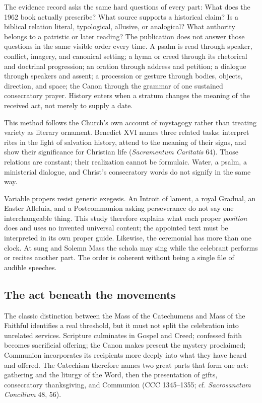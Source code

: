 {The evidence record asks the same hard questions of every part: What does the 1962 book actually prescribe? What source supports a historical claim? Is a biblical relation literal, typological, allusive, or analogical? What authority belongs to a patristic or later reading? The publication does not answer those questions in the same visible order every time. A psalm is read through speaker, conflict, imagery, and canonical setting; a hymn or creed through its rhetorical and doctrinal progression; an oration through address and petition; a dialogue through speakers and assent; a procession or gesture through bodies, objects, direction, and space; the Canon through the grammar of one sustained consecratory prayer. History enters when a stratum changes the meaning of the received act, not merely to supply a date.

This method follows the Church's own account of mystagogy rather than treating variety as literary ornament. Benedict XVI names three related tasks: interpret rites in the light of salvation history, attend to the meaning of their signs, and show their significance for Christian life (\emph{Sacramentum Caritatis} 64). Those relations are constant; their realization cannot be formulaic. Water, a psalm, a ministerial dialogue, and Christ's consecratory words do not signify in the same way.

Variable propers resist generic exegesis. An Introit of lament, a royal Gradual, an Easter Alleluia, and a Postcommunion asking perseverance do not say one interchangeable thing. This study therefore explains what each proper \emph{position} does and uses no invented universal content; the appointed text must be interpreted in its own proper guide. Likewise, the ceremonial has more than one clock. At sung and Solemn Mass the schola may sing while the celebrant performs or recites another part. The order is coherent without being a single file of audible speeches.

\subsection{The act beneath the movements}

The classic distinction between the Mass of the Catechumens and Mass of the Faithful identifies a real threshold, but it must not split the celebration into unrelated services. Scripture culminates in Gospel and Creed; confessed faith becomes sacrificial offering; the Canon makes present the mystery proclaimed; Communion incorporates its recipients more deeply into what they have heard and offered. The Catechism therefore names two great parts that form one act: gathering and the liturgy of the Word, then the presentation of gifts, consecratory thanksgiving, and Communion (CCC 1345--1355; cf. \emph{Sacrosanctum Concilium} 48, 56).

}
